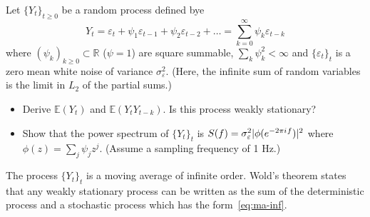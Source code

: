 \documentclass[11pt]{article}
\begin{document}
\begin{exercise}[subtitle=Infinite order moving average MA($\infty$)]
Let $\{Y_t\}_{t\geq 0}$ be a random process defined bye
\begin{equation}\label{eq:ma-inf}
    Y_t = \varepsilon_t + \psi_1 \varepsilon_{t-1} + \psi_2 \varepsilon_{t-2} + \dots = \sum_{k=0}^{\infty} \psi_k\varepsilon_{t-k}
\end{equation}
where $(\psi_k)_{k\geq0} \subset \mathbb{R}$ ($\psi=1$) are square summable, \ie $\sum_k \psi_k^2 < \infty$ and $\{\varepsilon_t\}_t$ is a zero mean white noise of variance $\sigma_\varepsilon^2$.
(Here, the infinite sum of random variables is the limit in $L_2$ of the partial sums.)
\begin{itemize}
    \item Derive $\mathbb{E}(Y_t)$ and $\mathbb{E}(Y_t Y_{t-k})$. Is this process weakly stationary?
    \item Show that the power spectrum of $\{Y_t\}_{t}$ is $S(f) = \sigma_\varepsilon^2 |\phi(e^{-2\pi{i\mkern1mu} f})|^2$ where $\phi(z) = \sum_j \psi_j z^j$. (Assume a sampling frequency of 1 Hz.)
\end{itemize}

The process $\{Y_t\}_{t}$ is a moving average of infinite order.
Wold's theorem states that any weakly stationary process can be written as the sum of the deterministic process and a stochastic process which has the form~\eqref{eq:ma-inf}.

\end{exercise}
\end{document}
